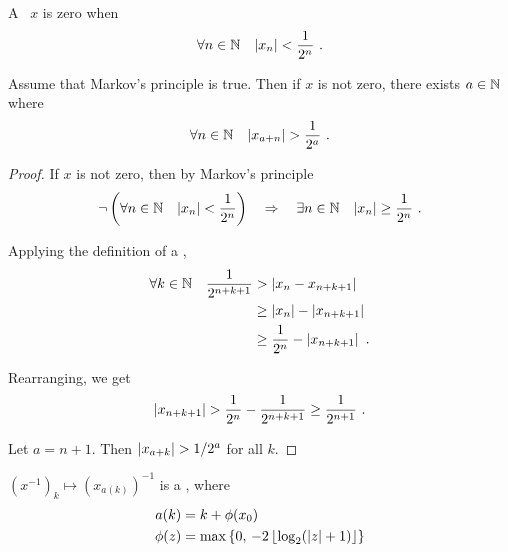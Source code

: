 \documentclass[leqno]{report}
\begin{document}
\begin{Definition}[Zero]
    A \FCCS \ $x$ is zero when
    \[ \forall {n \in \mathbb{N}} \quad {\left| x_n \right| < \frac{1}{2^n}} \ . \]
\end{Definition}

\begin{Lemma}[Apartness]
    Assume that Markov's principle is true. Then if $x$ is not zero, there exists $a \in \mathbb{N}$ where
    \[ \forall {n \in \mathbb{N}} \quad {\left| x_{a+n} \right| > \frac{1}{2^a}} \ . \]
\end{Lemma}

\begin{proof}
    If $x$ is not zero, then by Markov's principle
    \[
        \neg \left( \forall {n \in \mathbb{N}} \quad {\left| x_n \right| < \frac{1}{2^n}} \right)
        \quad \Rightarrow \quad
        \exists {n \in \mathbb{N}} \quad {\left| x_n \right| \geq \frac{1}{2^n}} \ .
    \]

    Applying the definition of a \FCCS,
    \begin{align*}
        \forall {k \in \mathbb{N}} \quad {\frac{1}{2^{n+k+1}}}
        &> \left| x_n - x_{n+k+1} \right| \\
        &\geq \left| x_n \right| - \left| x_{n+k+1} \right| \\
        &\geq \frac{1}{2^n} - \left| x_{n+k+1} \right| \ .
    \end{align*}

    Rearranging, we get
    \[
        \left| x_{n+k+1} \right|
        > \frac{1}{2^n} - \frac{1}{2^{n+k+1}}
        \geq \frac{1}{2^{n+1}} \ .
    \]

    Let $a = n + 1$. Then $\left| x_{a+k} \right| > 1/2^a$ for all $k$.
\end{proof}

\begin{Proposition}[Reciprocal]
    $\left(x^{-1}\right)_k \mapsto \left(x_{a(k)}\right)^{-1}$ is a \FCCS, where
    \begin{align*}
        a(k) &= k + \phi(x_0) \\
        \phi(z) &= \max \left\{  0,\, -2 \left\lfloor \log_2(\left| z \right| + 1) \right\rfloor  \right\}
    \end{align*}
\end{Proposition}
\end{document}
